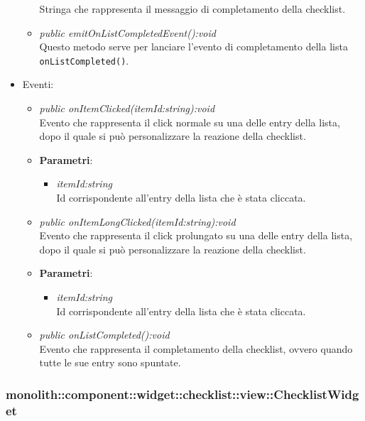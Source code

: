 \begin{itemize}
\begin{itemize}
{\begin{itemize}
		Stringa che rappresenta il messaggio di completamento della checklist.
		\end{itemize}}
	\item \textit{public emitOnListCompletedEvent():void}\\
	Questo metodo serve per lanciare l'evento di completamento della lista \texttt{onListCompleted()}.
	\end{itemize}
\item{Eventi}:
	\begin{itemize}
	\item \textit{public onItemClicked(itemId:string):void}\\
	Evento che rappresenta il click normale su una delle entry della lista, dopo il quale si può personalizzare la reazione della checklist.
		\item{\textbf{Parametri}: \begin{itemize}
		\item \textit{itemId:string}\\
		Id corrispondente all'entry della lista che è stata cliccata.
		\end{itemize}}
	\item \textit{public onItemLongClicked(itemId:string):void}\\
	Evento che rappresenta il click prolungato su una delle entry della lista, dopo il quale si può personalizzare la reazione della checklist.
		\item{\textbf{Parametri}: \begin{itemize}
		\item \textit{itemId:string}\\
		Id corrispondente all'entry della lista che è stata cliccata.
		\end{itemize}}
	\item \textit{public onListCompleted():void}\\
	Evento che rappresenta il completamento della checklist, ovvero quando tutte le sue entry sono spuntate.
	\end{itemize}
\end{itemize}

\subsubsection{monolith::component::widget::checklist::view::ChecklistWidget}

